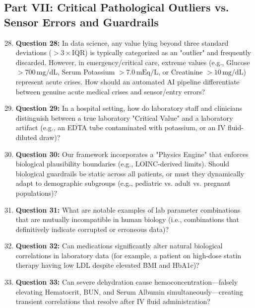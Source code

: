 \documentclass[MTech]{ugthesis}
\begin{document}
\begin{appendices}
\section*{Part VII: Critical Pathological Outliers vs. Sensor Errors and Guardrails}
\begin{enumerate}\setcounter{enumi}{27}
    \item \textbf{Question 28:} In data science, any value lying beyond three standard deviations ($> 3 \times \text{IQR}$) is typically categorized as an "outlier" and frequently discarded. However, in emergency/critical care, extreme values (e.g., Glucose $> 700\,\text{mg/dL}$, Serum Potassium $> 7.0\,\text{mEq/L}$, or Creatinine $> 10\,\text{mg/dL}$) represent acute crises. How should an automated AI pipeline differentiate between genuine acute medical crises and sensor/entry errors?
    \item \textbf{Question 29:} In a hospital setting, how do laboratory staff and clinicians distinguish between a true laboratory "Critical Value" and a laboratory artifact (e.g., an EDTA tube contaminated with potassium, or an IV fluid-diluted draw)?
    \item \textbf{Question 30:} Our framework incorporates a "Physics Engine" that enforces biological plausibility boundaries (e.g., LOINC-derived limits). Should biological guardrails be static across all patients, or must they dynamically adapt to demographic subgroups (e.g., pediatric vs. adult vs. pregnant populations)?
    \item \textbf{Question 31:} What are notable examples of lab parameter combinations that are mutually incompatible in human biology (i.e., combinations that definitively indicate corrupted or erroneous data)?
    \item \textbf{Question 32:} Can medications significantly alter natural biological correlations in laboratory data (for example, a patient on high-dose statin therapy having low LDL despite elevated BMI and HbA1c)?
    \item \textbf{Question 33:} Can severe dehydration cause hemoconcentration---falsely elevating Hematocrit, BUN, and Serum Albumin simultaneously---creating transient correlations that resolve after IV fluid administration?
\end{enumerate}


\end{appendices}
\end{document}
